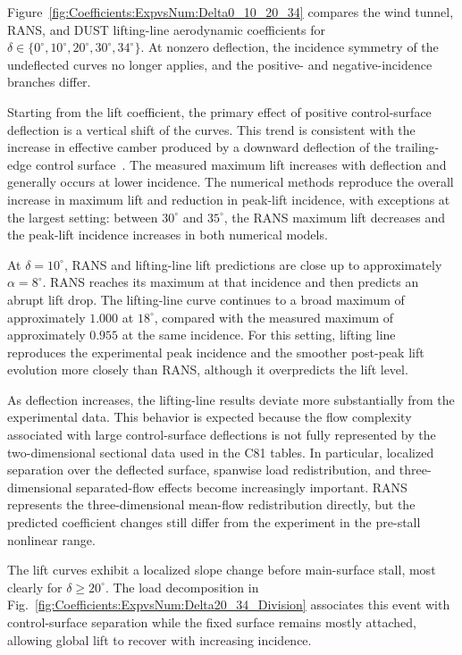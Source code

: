 \documentclass[journal ]{new-aiaa}
\begin{document}
Figure~\ref{fig:Coefficients:ExpvsNum:Delta0_10_20_34} compares the wind tunnel, RANS, and DUST lifting-line aerodynamic coefficients for $\delta\in\{0^\circ,10^\circ,20^\circ,30^\circ,34^\circ\}$.
At nonzero deflection, the incidence symmetry of the undeflected curves no longer applies, and the positive- and negative-incidence branches differ.

Starting from the lift coefficient, the primary effect of positive control-surface deflection is a vertical shift of the curves.
This trend is consistent with the increase in effective camber produced by a downward deflection of the trailing-edge control surface~\cite{abbott1959theory}.
The measured maximum lift increases with deflection and generally occurs at lower incidence. The numerical methods reproduce the overall increase in maximum lift and reduction in peak-lift incidence, with exceptions at the largest setting: between $30^\circ$ and $35^\circ$, the RANS maximum lift decreases and the peak-lift incidence increases in both numerical models.

At \(\delta=10^\circ\), RANS and lifting-line lift predictions are close up to approximately \(\alpha=8^\circ\).
RANS reaches its maximum at that incidence and then predicts an abrupt lift drop.
The lifting-line curve continues to a broad maximum of approximately \(1.000\) at \(18^\circ\), compared with the measured maximum of approximately \(0.955\) at the same incidence.
For this setting, lifting line reproduces the experimental peak incidence and the smoother post-peak lift evolution more closely than RANS, although it overpredicts the lift level.

As deflection increases, the lifting-line results deviate more substantially from the experimental data.
This behavior is expected because the flow complexity associated with large control-surface deflections is not fully represented by the two-dimensional sectional data used in the C81 tables.
In particular, localized separation over the deflected surface, spanwise load redistribution, and three-dimensional separated-flow effects become increasingly important.
RANS represents the three-dimensional mean-flow redistribution directly, but the predicted coefficient changes still differ from the experiment in the pre-stall nonlinear range.

The lift curves exhibit a localized slope change before main-surface stall, most clearly for \(\delta\geq20^\circ\).
The load decomposition in Fig.~\ref{fig:Coefficients:ExpvsNum:Delta20_34_Division} associates this event with control-surface separation while the fixed surface remains mostly attached, allowing global lift to recover with increasing incidence.
\end{document}
